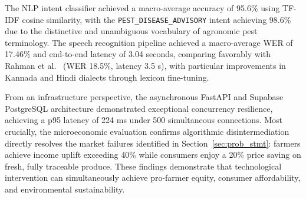 The NLP intent classifier achieved a macro-average accuracy of 95.6\% using TF-IDF cosine similarity, with the \texttt{PEST\_DISEASE\_ADVISORY} intent achieving 98.6\% due to the distinctive and unambiguous vocabulary of agronomic pest terminology. The speech recognition pipeline achieved a macro-average WER of 17.46\% and end-to-end latency of 3.04 seconds, comparing favorably with Rahman et al.~\cite{Rahman2025} (WER 18.5\%, latency 3.5 s), with particular improvements in Kannada and Hindi dialects through lexicon fine-tuning.

From an infrastructure perspective, the asynchronous FastAPI and Supabase PostgreSQL architecture demonstrated exceptional concurrency resilience, achieving a p95 latency of 224 ms under 500 simultaneous connections. Most crucially, the microeconomic evaluation confirms algorithmic disintermediation directly resolves the market failures identified in Section~\ref{sec:prob_stmt}: farmers achieve income uplift exceeding 40\% while consumers enjoy a 20\% price saving on fresh, fully traceable produce. These findings demonstrate that technological intervention can simultaneously achieve pro-farmer equity, consumer affordability, and environmental sustainability.

\chapterend
\cleardoublepage
